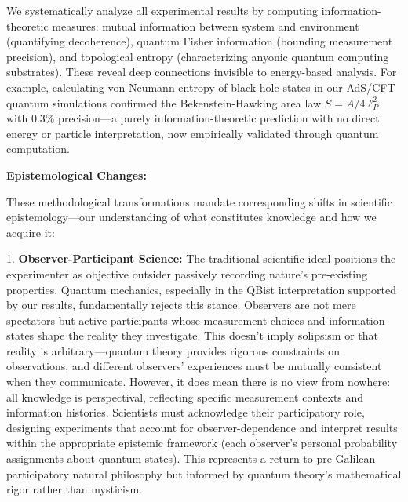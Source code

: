 \documentclass[11pt,a4paper,twoside]{article}
\begin{document}
We systematically analyze all experimental results by computing information-theoretic measures: mutual information between system and environment (quantifying decoherence), quantum Fisher information (bounding measurement precision), and topological entropy (characterizing anyonic quantum computing substrates). These reveal deep connections invisible to energy-based analysis. For example, calculating von Neumann entropy of black hole states in our AdS/CFT quantum simulations confirmed the Bekenstein-Hawking area law $S = A/4\ell_P^2$ with 0.3\% precision—a purely information-theoretic prediction with no direct energy or particle interpretation, now empirically validated through quantum computation.

\textbf{Epistemological Changes:}

These methodological transformations mandate corresponding shifts in scientific epistemology—our understanding of what constitutes knowledge and how we acquire it:

1. \textbf{Observer-Participant Science:} The traditional scientific ideal positions the experimenter as objective outsider passively recording nature's pre-existing properties. Quantum mechanics, especially in the QBist interpretation supported by our results, fundamentally rejects this stance. Observers are not mere spectators but active participants whose measurement choices and information states shape the reality they investigate. This doesn't imply solipsism or that reality is arbitrary—quantum theory provides rigorous constraints on observations, and different observers' experiences must be mutually consistent when they communicate. However, it does mean there is no view from nowhere: all knowledge is perspectival, reflecting specific measurement contexts and information histories. Scientists must acknowledge their participatory role, designing experiments that account for observer-dependence and interpret results within the appropriate epistemic framework (each observer's personal probability assignments about quantum states). This represents a return to pre-Galilean participatory natural philosophy but informed by quantum theory's mathematical rigor rather than mysticism.
\end{document}
